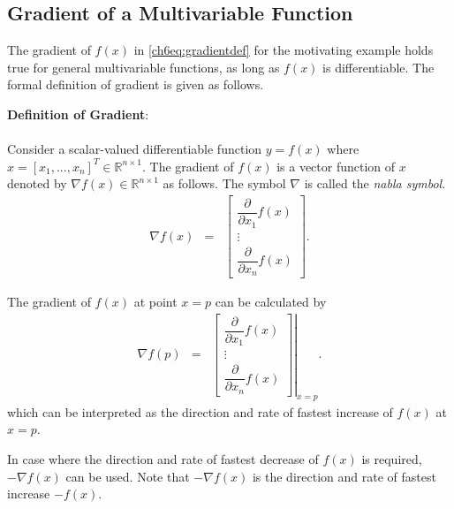 \subsection{Gradient of a Multivariable Function} \label{ch6subsec:gradientdef}

The gradient of $f(x)$ in \eqref{ch6eq:gradientdef} for the motivating example holds true for general multivariable functions, as long as $f(x)$ is differentiable. The formal definition of gradient is given as follows.

\begin{VF}
	\textbf{Definition of Gradient}:
	\\
	\\
Consider a scalar-valued differentiable function $y=f(x)$ where $x = [x_1,...,x_n]^T \in \mathbb{R}^{n \times 1}$. The gradient of $f(x)$ is a vector function of $x$ denoted by $\nabla f(x) \in \mathbb{R}^{n \times 1}$ as follows. The symbol $\nabla$ is called the \textit{nabla symbol}.
\begin{eqnarray}
  \nabla f(x) &=& \left[\begin{array}{c}
                          \dfrac{\partial}{\partial x_1}f(x) \\
                          \vdots \\
                          \dfrac{\partial}{\partial x_n}f(x)
                        \end{array}\right]. \nonumber
\end{eqnarray}

The gradient of $f(x)$ at point $x=p$ can be calculated by
\begin{eqnarray}
  \nabla f(p) &=& \left.\left[\begin{array}{c}
                         \dfrac{\partial}{\partial x_1}f(x) \\
                          \vdots \\
                          \dfrac{\partial}{\partial x_n}f(x)
                        \end{array}\right]\right|_{x = p}. \nonumber
\end{eqnarray}
which can be interpreted as the direction and rate of fastest increase of $f(x)$ at $x=p$.
	
\end{VF}

In case where the direction and rate of fastest decrease of $f(x)$ is required, $-\nabla f(x)$ can be used. Note that $-\nabla f(x)$ is the direction and rate of fastest increase $-f(x)$.

